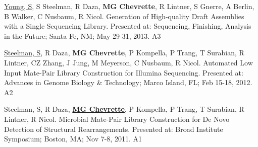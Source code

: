 \begin{cvpubs}
  \cvpub
    {\underline{Young, S}, S Steelman, R Daza, \textbf{MG Chevrette}, R Lintner, S Gnerre, A Berlin, B Walker, C Nusbaum, R Nicol.  Generation of High-quality Draft Assemblies with a Single Sequencing Library.  Presented at: Sequencing, Finishing, Analysis in the Future; Santa Fe, NM; May 29-31, 2013.} %
    {A3} %
    
  \cvpub
    {\underline{Steelman, S}, R Daza, \textbf{MG Chevrette}, P Kompella, P Trang, T Surabian, R Lintner, CZ Zhang, J Jung, M Meyerson, C Nusbaum, R Nicol.  Automated Low Input Mate-Pair Library Construction for Illumina Sequencing.  Presented at: Advances in Genome Biology \& Technology; Marco Island, FL; Feb 15-18, 2012.} %
    {A2} %
    
  \cvpub
    {Steelman, S, R Daza, \underline{\textbf{MG Chevrette}}, P Kompella, P Trang, T Surabian, R Lintner, R Nicol.  Microbial Mate-Pair Library Construction for De Novo Detection of Structural Rearrangements.  Presented at: Broad Institute Symposium; Boston, MA; Nov 7-8, 2011.} %
    {A1} %

\end{cvpubs}
